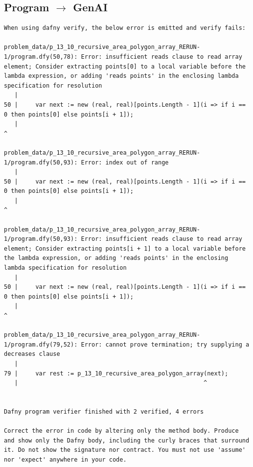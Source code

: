\documentclass{article}
\begin{document}
\subsection*{Program $\rightarrow$ GenAI}
\begin{lstlisting}
When using dafny verify, the below error is emitted and verify fails:

problem_data/p_13_10_recursive_area_polygon_array_RERUN-1/program.dfy(50,78): Error: insufficient reads clause to read array element; Consider extracting points[0] to a local variable before the lambda expression, or adding 'reads points' in the enclosing lambda specification for resolution
   |
50 |     var next := new (real, real)[points.Length - 1](i => if i == 0 then points[0] else points[i + 1]);
   |                                                                               ^

problem_data/p_13_10_recursive_area_polygon_array_RERUN-1/program.dfy(50,93): Error: index out of range
   |
50 |     var next := new (real, real)[points.Length - 1](i => if i == 0 then points[0] else points[i + 1]);
   |                                                                                              ^

problem_data/p_13_10_recursive_area_polygon_array_RERUN-1/program.dfy(50,93): Error: insufficient reads clause to read array element; Consider extracting points[i + 1] to a local variable before the lambda expression, or adding 'reads points' in the enclosing lambda specification for resolution
   |
50 |     var next := new (real, real)[points.Length - 1](i => if i == 0 then points[0] else points[i + 1]);
   |                                                                                              ^

problem_data/p_13_10_recursive_area_polygon_array_RERUN-1/program.dfy(79,52): Error: cannot prove termination; try supplying a decreases clause
   |
79 |     var rest := p_13_10_recursive_area_polygon_array(next);
   |                                                     ^


Dafny program verifier finished with 2 verified, 4 errors

Correct the error in code by altering only the method body. Produce and show only the Dafny body, including the curly braces that surround it. Do not show the signature nor contract. You must not use 'assume' nor 'expect' anywhere in your code.
\end{lstlisting}
\end{document}
